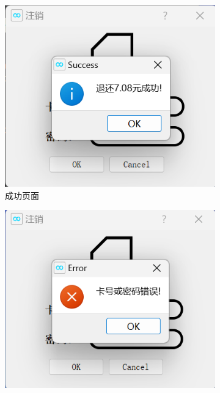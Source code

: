 \documentclass{article}
\begin{document}
    \begin{figure}[htbp]
        \centering
        \begin{subfigure}{0.24\linewidth}
            \centering
            \includegraphics[width=\linewidth]{figure/annul_success.png}
            \caption{成功页面}
            \label{annul_success}
        \end{subfigure}
        \centering
        \begin{subfigure}{0.24\linewidth}
            \centering
            \includegraphics[width=\linewidth]{figure/annul_id_password_error.png}

\end{subfigure}
\end{figure}
\end{document}
